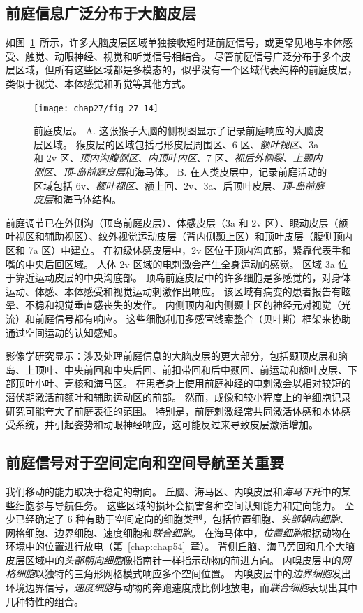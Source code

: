 \subsection{前庭信息广泛分布于大脑皮层}

如图~\ref{fig:27_14}~所示，许多大脑皮层区域单独接收短时延前庭信号，或更常见地与本体感受、触觉、动眼神经、视觉和听觉信号相结合。 
尽管前庭信号广泛分布于多个皮层区域，但所有这些区域都是多模态的，似乎没有一个区域代表纯粹的前庭皮层，类似于视觉、本体感觉和听觉等其他方式。


\begin{figure}[htbp]
	\centering
	\texttt{[image: chap27/fig\_27\_14]}
	\caption{前庭皮层。
		A. 这张猴子大脑的侧视图显示了记录前庭响应的大脑皮层区域。
		猴皮层的区域包括弓形皮层周围区、6 区、\textit{额叶视区}、3a 和 2v 区、\textit{顶内沟腹侧区}、\textit{内顶叶内区}、7 区、\textit{视后外侧裂}、\textit{上颞内侧区}、\textit{顶-岛前庭皮层}和海马体。
		B. 在人类皮层中，记录前庭活动的区域包括 6v、\textit{额叶视区}、额上回、2v、3a、后顶叶皮层、\textit{顶-岛前庭皮层}和海马体结构。}
	\label{fig:27_14}
\end{figure}


前庭调节已在外侧沟（顶岛前庭皮层）、体感皮层（3a 和 2v 区）、眼动皮层（额叶视区和辅助视区）、纹外视觉运动皮层（背内侧颞上区）和顶叶皮层（腹侧顶内区和 7a 区）中建立。
在初级体感皮层中，2v 区位于顶内沟底部，紧靠代表手和嘴的中央后回区域。
人体 2v 区域的电刺激会产生全身运动的感觉。
区域 3a 位于靠近运动皮层的中央沟底部。
顶岛前庭皮层中的许多细胞是多感觉的，对身体运动、体感、本体感受和视觉运动刺激作出响应。
该区域有病变的患者报告有眩晕、不稳和视觉垂直感丧失的发作。
内侧顶内和内侧颞上区的神经元对视觉（光流）和前庭信号都有响应。
这些细胞利用多感官线索整合（贝叶斯）框架来协助通过空间运动的认知感知。


影像学研究显示：涉及处理前庭信息的大脑皮层的更大部分，包括颞顶皮层和脑岛、上顶叶、中央前回和中央后回、前扣带回和后中颞回、前运动和额叶皮层、下部顶叶小叶、壳核和海马区。
在患者身上使用前庭神经的电刺激会以相对较短的潜伏期激活前额叶和辅助运动区的前部。
然而，成像和较小程度上的单细胞记录研究可能夸大了前庭表征的范围。
特别是，前庭刺激经常共同激活体感和本体感受系统，并引起姿势和动眼神经响应，这可能反过来导致皮层激活增加。



\subsection{前庭信号对于空间定向和空间导航至关重要}

我们移动的能力取决于稳定的朝向。
丘脑、海马区、内嗅皮层和\textit{海马下托}中的某些细胞参与导航任务。
这些区域的损坏会损害各种空间认知能力和定向能力。
至少已经确定了 6 种有助于空间定向的细胞类型，包括位置细胞、\textit{头部朝向细胞}、网格细胞、边界细胞、速度细胞和\textit{联合细胞}。
在海马体中，\textit{位置细胞}根据动物在环境中的位置进行放电（第~\ref{chap:chap54}~章）。
背侧丘脑、海马旁回和几个大脑皮层区域中的\textit{头部朝向细胞}像指南针一样指示动物的前进方向。
内嗅皮层中的\textit{网格细胞}以独特的三角形网格模式响应多个空间位置。
内嗅皮层中的\textit{边界细胞}发出环境边界信号，\textit{速度细胞}与动物的奔跑速度成比例地放电，而\textit{联合细胞}表现出其中几种特性的组合。


